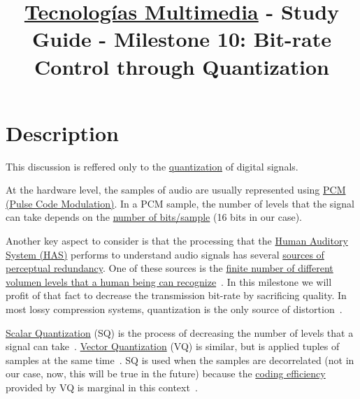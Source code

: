 \title{\href{https://www.ual.es/estudios/grados/presentacion/plandeestudios/asignatura/4015/40154321?idioma=zh_CN}{Tecnologías Multimedia} - Study Guide - Milestone 10: Bit-rate Control through Quantization}

\maketitle

\section{Description}

This discussion is reffered only to the
\href{https://en.wikipedia.org/wiki/Quantization_(signal_processing)}{quantization}
of digital signals.

At the hardware level, the samples of audio are usually represented
using \href{https://en.wikipedia.org/wiki/Pulse-code_modulation}{PCM
  (Pulse Code Modulation)}. In a PCM sample, the number of levels that
the signal can take depends on the
\href{https://en.wikipedia.org/wiki/Audio_bit_depth}{number of
  bits/sample} (16 bits in our case).

Another key aspect to consider is that the processing that the
\href{https://en.wikipedia.org/wiki/Auditory_system}{Human Auditory
  System (HAS)} performs to understand audio signals has several
\href{https://en.wikipedia.org/wiki/Psychoacoustics}{sources of
  perceptual redundancy}. One of these sources is the
\href{https://en.wikipedia.org/wiki/Equal-loudness_contour}{finite
  number of different volumen levels that a human being can
  recognize}~\cite{bosi2003intro}. In this milestone we will profit of
that fact to decrease the transmission bit-rate by sacrificing
quality.  In most lossy compression systems, quantization is the only
source of distortion~\cite{taubman2012jpeg2000}.

\href{https://en.wikipedia.org/wiki/Quantization_(signal_processing)}{Scalar
  Quantization} (SQ) is the process of decreasing the number of levels
that a signal can
take~\cite{sayood2017introduction}. \href{https://en.wikipedia.org/wiki/Vector_quantization}{Vector
  Quantization} (VQ) is similar, but is applied tuples of samples at
the same time~\cite{vetterli2014foundations}. SQ is used when the
samples are decorrelated (not in our case, now, this will be true in
the future) because the
\href{https://en.wikipedia.org/wiki/Quantization_(signal_processing)#Rate%E2%80%93distortion_optimization}{coding
  efficiency} provided by VQ is marginal in this
context~\cite{vetterli2014foundations}.

